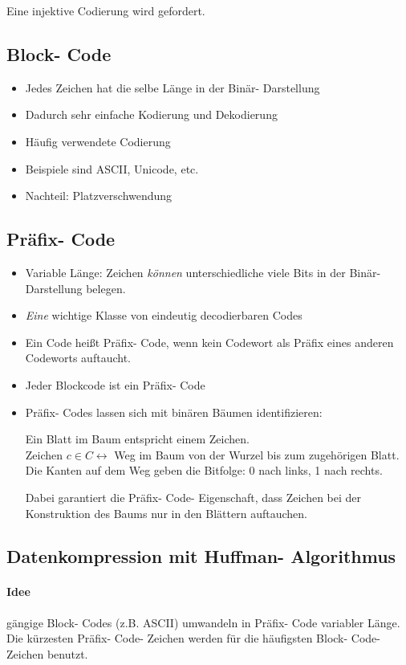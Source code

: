 \documentclass[fleqn]{scrartcl}
\begin{document}
Eine injektive Codierung wird gefordert.
\subsection{Block- Code}
\begin{itemize}
\item Jedes Zeichen hat die selbe Länge in der Binär- Darstellung
\item Dadurch sehr einfache Kodierung und Dekodierung
\item Häufig verwendete Codierung
\item Beispiele sind ASCII, Unicode, etc.
\item Nachteil: \glqq Platzverschwendung \grqq
\end{itemize}
\subsection{Präfix- Code}
\begin{itemize}
\item Variable Länge: Zeichen \textit{können} unterschiedliche viele Bits in der Binär- Darstellung belegen.
\item \textit{Eine} wichtige Klasse von eindeutig decodierbaren Codes
\item Ein Code heißt Präfix- Code, wenn kein Codewort als Präfix eines anderen Codeworts auftaucht.
\item Jeder Blockcode ist ein Präfix- Code
\item Präfix- Codes lassen sich mit binären Bäumen identifizieren:

Ein Blatt im Baum entspricht einem Zeichen.\\
Zeichen $c \in C \leftrightarrow$ Weg im Baum von der Wurzel bis zum zugehörigen Blatt.\\
Die Kanten auf dem Weg geben die Bitfolge: 0 nach links, 1 nach rechts.

Dabei garantiert die Präfix- Code- Eigenschaft, dass Zeichen bei der Konstruktion des Baums nur in den Blättern auftauchen.
\end{itemize}

\newpage
\subsection{Datenkompression mit Huffman- Algorithmus}
\paragraph*{Idee} gängige Block- Codes (z.B. ASCII) umwandeln in Präfix- Code variabler Länge. Die kürzesten Präfix- Code- Zeichen werden für die häufigsten Block- Code- Zeichen benutzt.
\end{document}
